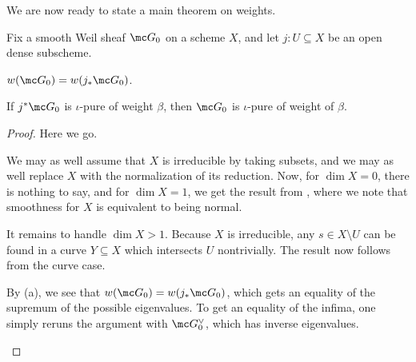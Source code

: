 \documentclass[../notes.tex]{subfiles}
\begin{document}
We are now ready to state a main theorem on weights.
\begin{theorem} \label{thm:semicont-weight-i}
	Fix a smooth Weil sheaf $\mc G_0$ on a scheme $X$, and let $j\colon U\subseteq X$ be an open dense subscheme.
	\begin{listalph}
		\item $w(\mc G_0)=w(j_*\mc G_0)$.
		\item If $j^*\mc G_0$ is $\iota$-pure of weight $\beta$, then $\mc G_0$ is $\iota$-pure of weight of $\beta$.
	\end{listalph}
\end{theorem}
\begin{proof}
	Here we go.
	\begin{listalph}
		\item We may as well assume that $X$ is irreducible by taking subsets, and we may as well replace $X$ with the normalization of its reduction. Now, for $\dim X=0$, there is nothing to say, and for $\dim X=1$, we get the result from , where we note that smoothness for $X$ is equivalent to being normal.

		It remains to handle $\dim X>1$. Because $X$ is irreducible, any $s\in X\setminus U$ can be found in a curve $Y\subseteq X$ which intersects $U$ nontrivially. The result now follows from the curve case.

		\item By (a), we see that $w(\mc G_0)=w(j_*\mc G_0)$, which gets an equality of the supremum of the possible eigenvalues. To get an equality of the infima, one simply reruns the argument with $\mc G_0^\lor$, which has inverse eigenvalues.
		\qedhere
	\end{listalph}
\end{proof}
\end{document}
